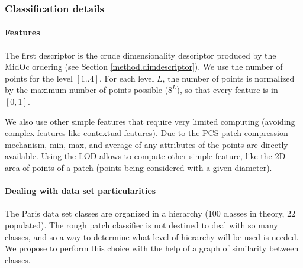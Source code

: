 		
		\subsubsection{Classification details}  
		\paragraph{Features}
		The first descriptor is the crude dimensionality descriptor produced by the MidOc ordering (see Section \ref{method.dimdescriptor}).
		We use the number of points for the level $[1..4]$. For each level $L$, the number of points is normalized by the maximum number of points possible ($8^L$), so that every feature is in $[0,1]$.
		
		\label{method.classification.other_feature}
		We also use other simple features that require very limited computing (avoiding complex features like contextual features). 
		Due to the PCS patch compression mechanism,
		min, max, and average of any attributes of the points are directly available.
		Using the LOD allows to compute other simple feature, like the 2D area of points of a patch (points being considered with a given diameter). 
		
		\paragraph{Dealing with data set particularities}
		The Paris data set classes are organized in a hierarchy (100 classes in theory, 22 populated).
		The rough patch classifier is not destined to deal with so many classes,
		and so a way to determine what level of hierarchy will be used is needed.
		We propose to perform this choice with the help of a graph of similarity between classes.

